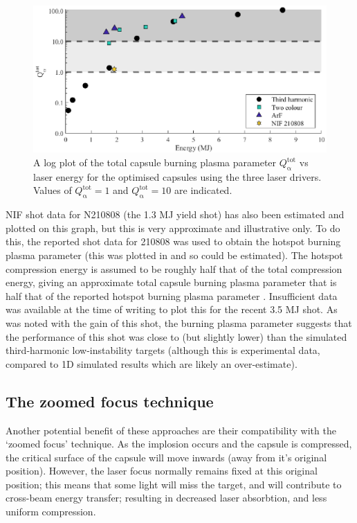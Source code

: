 \begin{figure}[ht]
\centering
\includegraphics{figures/FurtherSims/QTwoColour.eps}
\caption{A log plot of the total capsule burning plasma parameter $Q^\mathrm{{tot}}_{\mathrm{\alpha}}$ vs laser energy for the optimised capsules using the three laser drivers. Values of $Q^\mathrm{{tot}}_{\mathrm{\alpha}} = 1$ and $Q^\mathrm{{tot}}_{\mathrm{\alpha}} = 10$ are indicated.}
\label{fig:HeatedQ}
\end{figure}

NIF shot data for N210808 (the 1.3 MJ yield shot) has also been estimated and plotted on this graph, but this is very approximate and illustrative only. To do this, the reported shot data for 210808 \cite{Abu-Shawareb2022} was used to obtain the hotspot burning plasma parameter (this was plotted in \cite{Abu-Shawareb2022} and so could be estimated). The hotspot compression energy is assumed to be roughly half that of the total compression energy, giving an approximate total capsule burning plasma parameter that is half that of the reported hotspot burning plasma parameter \cite{Betti2015}. Insufficient data was available at the time of writing to plot this for the recent 3.5 MJ shot. As was noted with the gain of this shot, the burning plasma parameter suggests that the performance of this shot was close to (but slightly lower) than the simulated third-harmonic low-instability targets (although this is experimental data, compared to 1D simulated results which are likely an over-estimate).

\subsection{The zoomed focus technique}

Another potential benefit of these approaches are their compatibility with the `zoomed focus' technique. As the implosion occurs and the capsule is compressed, the critical surface of the capsule will move inwards (away from it's original position). However, the laser focus normally remains fixed at this original position; this means that some light will miss the target, and will contribute to cross-beam energy transfer; resulting in decreased laser absorbtion, and less uniform compression.

